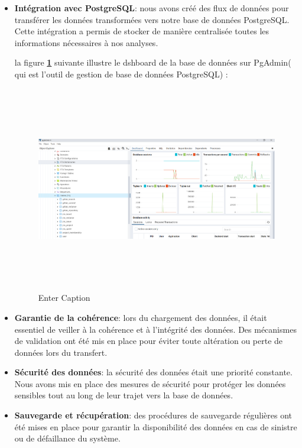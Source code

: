 \begin{itemize}
            \item \textbf{Intégration avec PostgreSQL}: nous avons créé des flux de données pour transférer les données transformées vers notre base de données PostgreSQL. Cette intégration a permis de stocker de manière centralisée toutes les informations nécessaires à nos analyses.
            \par la figure \textbf{\ref{fig:database}} suivante illustre le dshboard de la base de données sur PgAdmin( qui est l'outil de gestion de base de données PostgreSQL) :
            \begin{figure}[H]
            \centering
            \includegraphics[width=17cm , height=9cm]{img//captures/postgres.png}
            \caption{Enter Caption}
            \label{fig:database}
            \end{figure}
            \item \textbf{Garantie de la cohérence}: lors du chargement des données, il était essentiel de veiller à la cohérence et à l'intégrité des données. Des mécanismes de validation ont été mis en place pour éviter toute altération ou perte de données lors du transfert.
            \item \textbf{Sécurité des données}: la sécurité des données était une priorité constante. Nous avons mis en place des mesures de sécurité pour protéger les données sensibles tout au long de leur trajet vers la base de données.
            \item \textbf{Sauvegarde et récupération}: des procédures de sauvegarde régulières ont été mises en place pour garantir la disponibilité des données en cas de sinistre ou de défaillance du système.
        \end{itemize}
